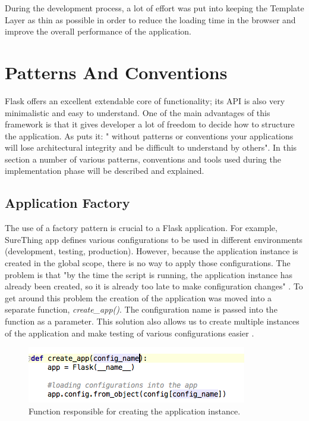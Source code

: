 During the development process, a lot of effort was put into keeping the Template Layer as thin as possible in order to reduce the loading time in the browser and improve the overall performance of the application.

\section{Patterns And Conventions}
\label{sec:patternsandconventions}
Flask offers an excellent extendable core of functionality; its API is also very minimalistic and easy to understand. One of the  main advantages of this framework is that it gives developer a lot of freedom to decide how to structure the application. As \citet{article:howIstructureMyFlaskApps} puts it: " without patterns or conventions your applications will lose architectural integrity and be difficult to understand by others". In this section a number of various patterns, conventions and tools used during the implementation phase will be described and explained.

\subsection{Application Factory}
\label{subsec:applicationfactory}
The use of a factory pattern is crucial to a Flask application. For example, SureThing app defines various configurations to be used in different environments (development, testing, production). However, because the application instance is created in the global scope, there is no way to apply those configurations. The problem is that "by the time the script is running, the application instance has already been created, so it is already too late to make configuration changes" \citep{book:Grindberg2014FlaskWebDevelopment}. To get around this problem the creation of the application was moved into a separate function, \emph{create\_app()}. The configuration name is passed into the function as a parameter. This solution also allows us to create multiple instances of the application and make testing of various configurations easier \citep{documentation:FlaskApplicationFactories}.

\begin{figure}[H]
	\begin{center}
		\includegraphics[width=.50\textwidth]{impl/images/createApp}
		\caption{Function responsible for creating the application instance.} \label{fig:using:createapp}
	\end{center}
\end{figure}

